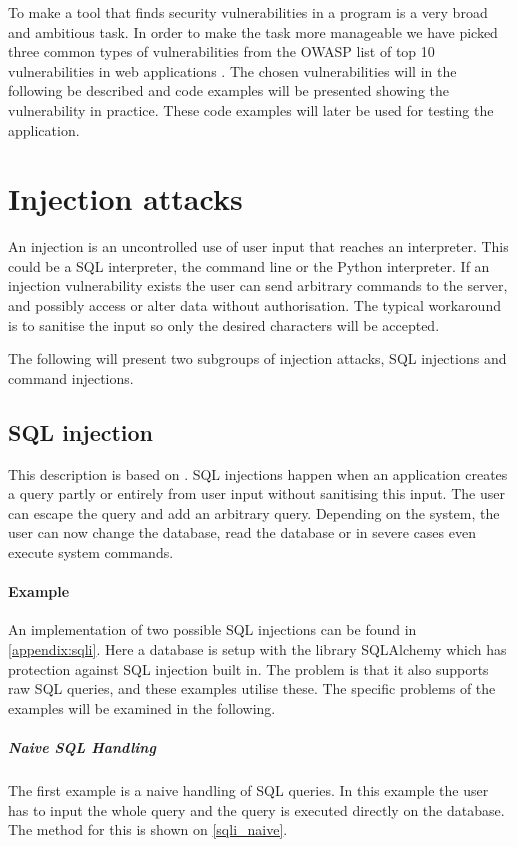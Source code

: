 \label{security_vulnerabilities}
To make a tool that finds security vulnerabilities in a program is a very broad and ambitious task.
In order to make the task more manageable we have picked three common types of vulnerabilities from the OWASP list of top 10 vulnerabilities in web applications \cite{OWASP10}.
The chosen vulnerabilities will in the following be described and code examples will be presented showing the vulnerability in practice.
These code examples will later be used for testing the application.

\section{Injection attacks}\label{vulnerabilities:injection}
An injection is an uncontrolled use of user input that reaches an interpreter.
This could be a SQL interpreter, the command line or the Python interpreter.
If an injection vulnerability exists the user can send arbitrary commands to the server, and possibly access or alter data without authorisation.
The typical workaround is to sanitise the input so only the desired characters will be accepted. \citep{OWASPTOP10PDF}

The following will present two subgroups of injection attacks, SQL injections and command injections.

\subsection{SQL injection}\label{vulnerabilities:sqli}
This description is based on \citet{sqlinjection}.
SQL injections happen when an application creates a query partly or entirely from user input without sanitising this input.
The user can escape the query and add an arbitrary query.
Depending on the system, the user can now change the database, read the database or in severe cases even execute system commands.

\paragraph{Example} An implementation of two possible SQL injections can be found in \cref{appendix:sqli}.
Here a database is setup with the library SQLAlchemy which has protection against SQL injection built in.
The problem is that it also supports raw SQL queries, and these examples utilise these.
The specific problems of the examples will be examined in the following.

\subparagraph{Naive SQL Handling}
The first example is a naive handling of SQL queries.
In this example the user has to input the whole query and the query is executed directly on the database.
The method for this is shown on \cref{sqli_naive}.

